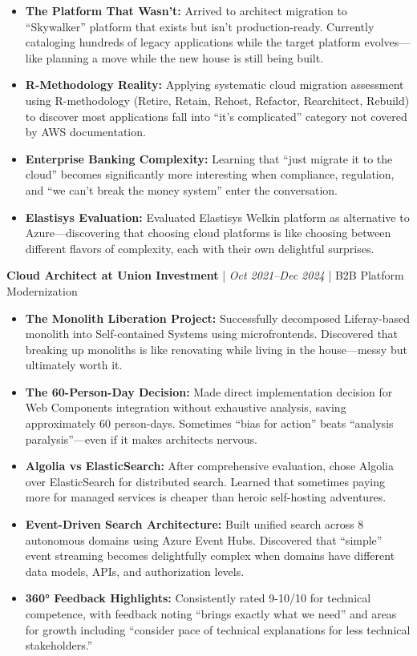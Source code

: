 \documentclass[11pt,a4paper]{article}
\newcommand{\jobheader}[3]{
    \vspace{0.2em}
    \textbf{#1} | \textit{#2} | #3
    \vspace{0.1em}
}
\begin{document}
\begin{itemize}[leftmargin=1em,topsep=0pt,itemsep=0.2em]
\item \textbf{The Platform That Wasn't:} Arrived to architect migration to ``Skywalker'' platform that exists but isn't production-ready. Currently cataloging hundreds of legacy applications while the target platform evolves---like planning a move while the new house is still being built.
\item \textbf{R-Methodology Reality:} Applying systematic cloud migration assessment using R-methodology (Retire, Retain, Rehost, Refactor, Rearchitect, Rebuild) to discover most applications fall into ``it's complicated'' category not covered by AWS documentation.
\item \textbf{Enterprise Banking Complexity:} Learning that ``just migrate it to the cloud'' becomes significantly more interesting when compliance, regulation, and ``we can't break the money system'' enter the conversation.
\item \textbf{Elastisys Evaluation:} Evaluated Elastisys Welkin platform as alternative to Azure---discovering that choosing cloud platforms is like choosing between different flavors of complexity, each with their own delightful surprises.
\end{itemize}

\jobheader{Cloud Architect at Union Investment}{Oct 2021--Dec 2024}{B2B Platform Modernization}

\begin{itemize}[leftmargin=1em,topsep=0pt,itemsep=0.2em]
\item \textbf{The Monolith Liberation Project:} Successfully decomposed Liferay-based monolith into Self-contained Systems using microfrontends. Discovered that breaking up monoliths is like renovating while living in the house---messy but ultimately worth it.
\item \textbf{The 60-Person-Day Decision:} Made direct implementation decision for Web Components integration without exhaustive analysis, saving approximately 60 person-days. Sometimes ``bias for action'' beats ``analysis paralysis''---even if it makes architects nervous.
\item \textbf{Algolia vs ElasticSearch:} After comprehensive evaluation, chose Algolia over ElasticSearch for distributed search. Learned that sometimes paying more for managed services is cheaper than heroic self-hosting adventures.
\item \textbf{Event-Driven Search Architecture:} Built unified search across 8 autonomous domains using Azure Event Hubs. Discovered that ``simple'' event streaming becomes delightfully complex when domains have different data models, APIs, and authorization levels.
\item \textbf{360° Feedback Highlights:} Consistently rated 9-10/10 for technical competence, with feedback noting ``brings exactly what we need'' and areas for growth including ``consider pace of technical explanations for less technical stakeholders.''
\end{itemize}
\end{document}
